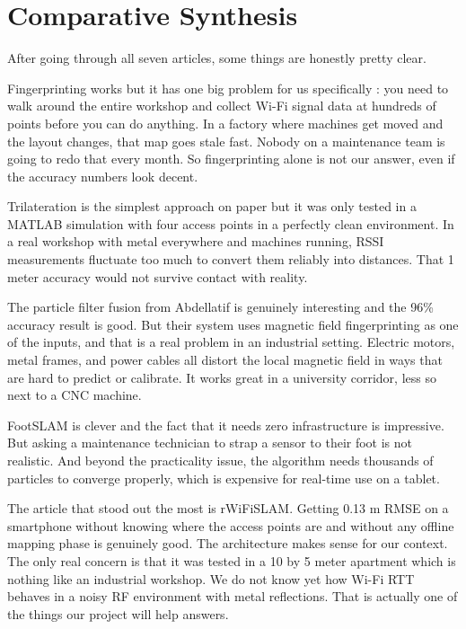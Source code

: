 \documentclass{ipgpmaster}
\begin{document}
\section{Comparative Synthesis}

After going through all seven articles, some things are honestly pretty clear.

Fingerprinting works but it has one big problem for us specifically : you need to walk around the entire workshop and collect Wi-Fi signal data at hundreds of points before you can do anything. In a factory where machines get moved and the layout changes, that map goes stale fast. Nobody on a maintenance team is going to redo that every month. So fingerprinting alone is not our answer, even if the accuracy numbers look decent.

Trilateration is the simplest approach on paper but it was only tested in a MATLAB simulation with four access points in a perfectly clean environment. In a real workshop with metal everywhere and machines running, RSSI measurements fluctuate too much to convert them reliably into distances. That 1 meter accuracy would not survive contact with reality.

The particle filter fusion from Abdellatif is genuinely interesting and the 96\% accuracy result is good. But their system uses magnetic field fingerprinting as one of the inputs, and that is a real problem in an industrial setting. Electric motors, metal frames, and power cables all distort the local magnetic field in ways that are hard to predict or calibrate. It works great in a university corridor, less so next to a CNC machine.

FootSLAM is clever and the fact that it needs zero infrastructure is impressive. But asking a maintenance technician to strap a sensor to their foot is not realistic. And beyond the practicality issue, the algorithm needs thousands of particles to converge properly, which is expensive for real-time use on a tablet.

The article that stood out the most is rWiFiSLAM. Getting 0.13 m RMSE on a smartphone without knowing where the access points are and without any offline mapping phase is genuinely good. The architecture makes sense for our context. The only real concern is that it was tested in a 10 by 5 meter apartment which is nothing like an industrial workshop. We do not know yet how Wi-Fi RTT behaves in a noisy RF environment with metal reflections. That is actually one of the things our project will help answers.
\end{document}
